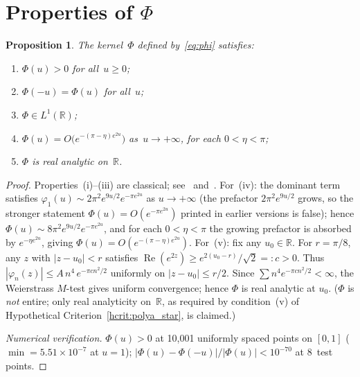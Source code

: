 \documentclass[11pt]{article}
\newtheorem{proposition}[theorem]{Proposition}
\theoremstyle{definition}
\theoremstyle{remark}
\begin{document}
\section{Properties of $\Phi$}
\label{sec:phi}

\begin{proposition}\label{prop:phi_properties}
The kernel~$\Phi$ defined by~\eqref{eq:phi} satisfies:
\begin{enumerate}[label=(\roman*)]
\item $\Phi(u) > 0$ for all~$u \geq 0$;
\item $\Phi(-u) = \Phi(u)$ for all~$u$;
\item $\Phi \in L^1(\mathbb{R})$;
\item $\Phi(u) = O\bigl(e^{-(\pi-\eta) e^{2u}}\bigr)$ as~$u \to +\infty$,
  for each $0 < \eta < \pi$;
\item $\Phi$ is real analytic on~$\mathbb{R}$.
\end{enumerate}
\end{proposition}

\begin{proof}
Properties~(i)--(iii) are classical; see~\cite[\S2.10]{titchmarsh1986}
and~\cite[Theorem~A]{csordas1989}.
For~(iv): the dominant term satisfies
$\varphi_1(u) \sim 2\pi^2 e^{9u/2} e^{-\pi e^{2u}}$ as $u \to +\infty$
(the prefactor $2\pi^2 e^{9u/2}$ grows, so the stronger statement
$\Phi(u) = O(e^{-\pi e^{2u}})$ printed in earlier versions is false);
hence $\Phi(u) \sim 8\pi^2 e^{9u/2} e^{-\pi e^{2u}}$, and for each
$0 < \eta < \pi$ the growing prefactor is absorbed by
$e^{-\eta e^{2u}}$, giving $\Phi(u) = O(e^{-(\pi-\eta)e^{2u}})$.
For~(v): fix any $u_0\in\mathbb{R}$.
For $r = \pi/8$, any $z$ with $|z - u_0| < r$ satisfies
$\operatorname{Re}(e^{2z}) \geq e^{2(u_0-r)}/\sqrt{2} =: c > 0$.
Thus $|\varphi_n(z)| \leq A\,n^4\,e^{-\pi c n^2/2}$ uniformly on $|z-u_0|\leq r/2$.
Since $\sum n^4 e^{-\pi c n^2/2} < \infty$, the Weierstrass $M$-test gives uniform
convergence; hence $\Phi$ is real analytic at $u_0$.
($\Phi$ is \emph{not} entire; only real analyticity on~$\mathbb{R}$, as required by
condition~(v) of Hypothetical Criterion~\ref{hcrit:polya_star}, is claimed.)

\emph{Numerical verification.}
$\Phi(u) > 0$ at 10{,}001 uniformly spaced points on $[0,1]$
($\min = 5.51 \times 10^{-7}$ at $u = 1$);
$|\Phi(u) - \Phi(-u)|/|\Phi(u)| < 10^{-70}$ at 8~test points.
\end{proof}
\end{document}
